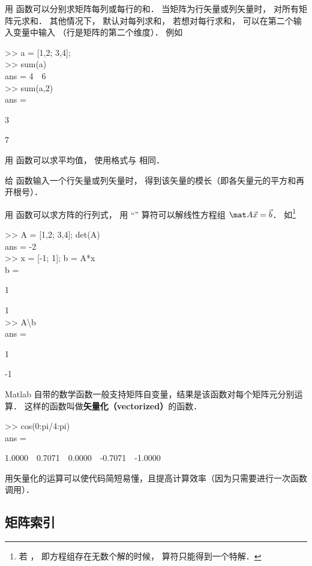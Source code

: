 用  函数可以分别求矩阵每列或每行的和． 当矩阵为行矢量或列矢量时，  对所有矩阵元求和． 其他情况下，  默认对每列求和， 若想对每行求和， 可以在第二个输入变量中输入  （行是矩阵的第二个维度）． 例如
\begin{Command}
>> a = [1,2; 3,4];\\
>> sum(a)\\
ans = 4\ \ 6\\
>> sum(a,2)\\
ans =\par 3\par 7
\end{Command}
用  函数可以求平均值， 使用格式与  相同．

给  函数输入一个行矢量或列矢量时， 得到该矢量的模长（即各矢量元的平方和再开根号）． 

用  函数可以求方阵的行列式， 用 “\x{\textbackslash}” 算符可以解线性方程组%
$\mat A \vec x = \vec b$． 如\footnote{若 ， 即方程组存在无数个解的时候， \x{\textbackslash} 算符只能得到一个特解． }
\begin{Command}
>> A = [1,2; 3,4]; det(A)\\
ans = -2\\
>> x = [-1; 1]; b = A*x\\
b =\par 1\par 1\\
>> A\textbackslash b\\
ans = \par 1\par -1
\end{Command}


Matlab 自带的数学函数一般支持矩阵自变量，结果是该函数对每个矩阵元分别运算． 这样的函数叫做\textbf{矢量化（vectorized）}的函数．
\begin{Command}
>> cos(0:pi/4:pi)\\
ans = \par
1.0000\ \ 0.7071\ \ 0.0000\ \ -0.7071\ \ -1.0000
\end{Command}
用矢量化的运算可以使代码简短易懂，且提高计算效率（因为只需要进行一次函数调用）．


\subsection{矩阵索引}

